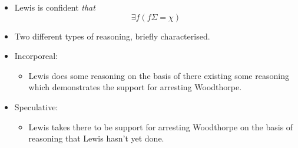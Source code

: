 \documentclass[10pt]{article}
\newcommand{\futin}{\ensuremath{\Sigma}}
\newcommand{\futout}{\ensuremath{\chi}}
\begin{document}
\begin{itemize}
\item Lewis is confident \emph{that} \[\exists f(f\futin = \futout)\]
\end{itemize}



\begin{itemize}
\item Two different types of reasoning, briefly characterised.
\end{itemize}

\begin{itemize}
\item Incorporeal:
  \begin{itemize}
  \item Lewis does some reasoning on the basis of there existing some reasoning which demonstrates the support for arresting Woodthorpe.
  \end{itemize}
\item Speculative:
  \begin{itemize}
  \item Lewis takes there to be support for arresting Woodthorpe on the basis of reasoning that Lewis hasn't yet done.
  \end{itemize}
\end{itemize}
\end{document}
